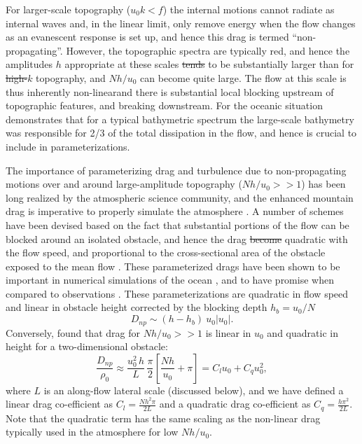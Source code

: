 \documentclass[twocol]{ametsocV5}
\providecommand{\DIFadd}[1]{{\protect\color{blue}\uwave{#1}}} %
\providecommand{\DIFdel}[1]{{\protect\color{red}\sout{#1}}}                      %
\providecommand{\DIFaddbegin}{} %
\providecommand{\DIFaddend}{} %
\providecommand{\DIFdelbegin}{} %
\providecommand{\DIFdelend}{} %
\begin{document}
For larger-scale topography ($u_0k<f$) the internal motions cannot radiate as internal waves and, in the linear limit, only remove energy when the flow changes as an evanescent response is set up, and hence this drag is termed ``non-propagating''.  However, the topographic spectra are typically red, and hence the amplitudes $h$ appropriate at these scales \DIFdelbegin \DIFdel{tends }\DIFdelend \DIFaddbegin \DIFadd{tend }\DIFaddend to be substantially larger than for \DIFdelbegin \DIFdel{high-$k$ }\DIFdelend \DIFaddbegin \DIFadd{high-wavenumber }\DIFaddend topography, and $Nh/u_0$ can become quite large.  The flow at this scale is thus inherently non-linear\DIFaddbegin \DIFadd{, }\DIFaddend and there is substantial local blocking upstream of topographic features, and breaking downstream. For the oceanic situation\DIFaddbegin \DIFadd{, }\DIFaddend \citet{klymak18} demonstrates that for a typical bathymetric spectrum  \citep[i.e.\ the ones used by][]{nikurashinferrari14} the large-scale bathymetry was responsible for 2/3 of the total dissipation in the flow, and hence is crucial to include in parameterizations.  

The importance of parameterizing drag and turbulence due to non-propagating motions over and around large-amplitude topography ($Nh/u_0 >> 1$) has been long realized by the atmospheric science community, and the enhanced mountain drag is imperative to properly simulate the atmosphere \citep[i.e.][]{bacmeisterpierrhumbert88,LottMiller97}.  A number of schemes have been devised based on the fact that substantial portions of the flow can be blocked around an isolated obstacle, and hence the drag \DIFdelbegin \DIFdel{become }\DIFdelend \DIFaddbegin \DIFadd{becomes }\DIFaddend quadratic with the flow speed, and proportional to the cross-sectional area of the obstacle exposed to the mean flow \citep[i.e.][]{ScinoccaMcFarlane00, Garner05}.  These parameterized drags have been shown to be important in numerical simulations of the ocean \citep{trossmanetal13,trossmanetal2016}, and to have promise when compared to observations \citep{TrossmanEtAl15}.  These parameterizations are quadratic in flow speed and linear in obstacle height corrected by the blocking depth $h_b = u_0/N$\DIFaddbegin \DIFadd{, i.e.
}\DIFaddend \begin{equation}
    D_{np} \sim (h-h_b)\ u_0 \left|u_0\right|.
\end{equation}
Conversely, \citep{klymaketal10a} found that drag for $Nh/u_0 >> 1$ is linear in $u_0$ and quadratic in height for a two-dimensional obstacle:  
\begin{equation}
    \frac{D_{np}}{\rho_0} \approx \frac{u_0^2\, h}{L}\, \frac{\pi}{2}\left[\frac{N h}{u_0}+ \pi\right] = C_l u_0 + C_q u_0^2,
    \label{eq:FormDragParam}
\end{equation}
where $L$ is an along-flow lateral scale (discussed below), and we have defined a linear drag co-efficient as $C_l = \frac{N h^2\pi}{2L}$ and a quadratic drag co-efficient as $C_q = \frac{h\pi^2}{2L}$.  Note that the quadratic  term has the same scaling as the non-linear drag typically used in the atmosphere for low $Nh/u_0$.  
\end{document}
